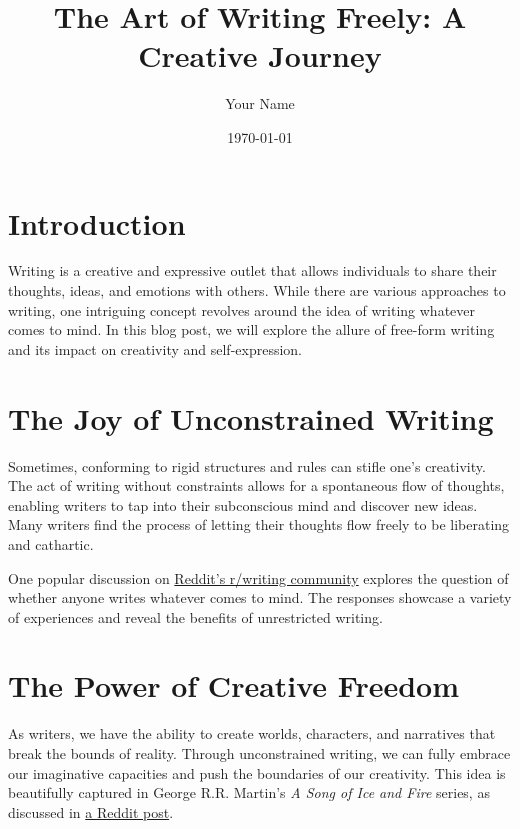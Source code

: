 \documentclass{article}
\begin{document}
\title{The Art of Writing Freely: A Creative Journey}
\author{Your Name}
\date{\today}

\maketitle

\section{Introduction}

Writing is a creative and expressive outlet that allows individuals to share their thoughts, ideas, and emotions with others. While there are various approaches to writing, one intriguing concept revolves around the idea of writing whatever comes to mind. In this blog post, we will explore the allure of free-form writing and its impact on creativity and self-expression.

\section{The Joy of Unconstrained Writing}

Sometimes, conforming to rigid structures and rules can stifle one's creativity. The act of writing without constraints allows for a spontaneous flow of thoughts, enabling writers to tap into their subconscious mind and discover new ideas. Many writers find the process of letting their thoughts flow freely to be liberating and cathartic.

One popular discussion on \href{https://www.reddit.com/r/writing/comments/4w1d3s/does\_anyone\_just\_write\_whatever\_comes\_to\_mind\_say/}{Reddit's r/writing community} explores the question of whether anyone writes whatever comes to mind. The responses showcase a variety of experiences and reveal the benefits of unrestricted writing.

\section{The Power of Creative Freedom}

As writers, we have the ability to create worlds, characters, and narratives that break the bounds of reality. Through unconstrained writing, we can fully embrace our imaginative capacities and push the boundaries of our creativity. This idea is beautifully captured in George R.R. Martin's \textit{A Song of Ice and Fire} series, as discussed in \href{https://www.reddit.com/r/asoiaf/comments/i8zn5m/whatever\_he\_chose\_jaime\_lannisters\_entry\_in\_the/}{a Reddit post}.
\end{document}

